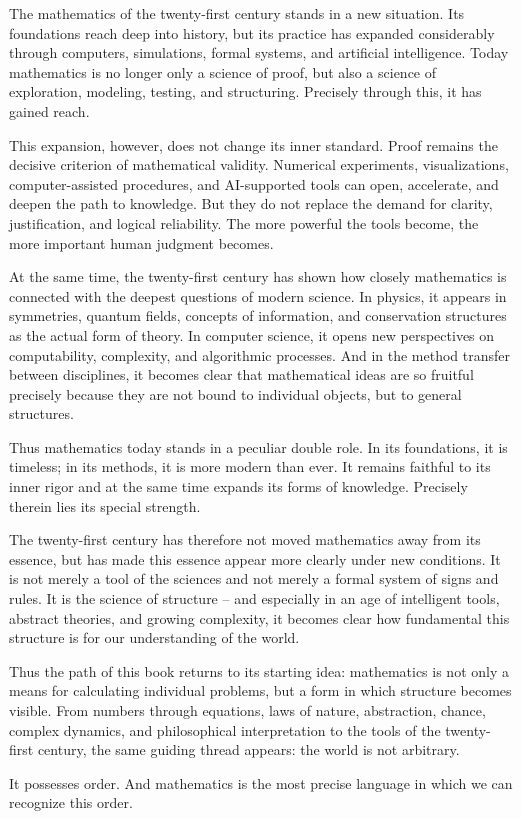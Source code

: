 The mathematics of the twenty-first century stands in a new situation.
Its foundations reach deep into history,
but its practice has expanded considerably through computers,
simulations,
formal systems,
and artificial intelligence.
Today mathematics is no longer only a science of proof,
but also a science of exploration,
modeling,
testing,
and structuring.
Precisely through this, it has gained reach.

This expansion, however, does not change its inner standard.
Proof remains the decisive criterion
of mathematical validity.
Numerical experiments,
visualizations,
computer-assisted procedures,
and AI-supported tools
can open,
accelerate,
and deepen the path to knowledge.
But they do not replace the demand for clarity,
justification,
and logical reliability.
The more powerful the tools become,
the more important human judgment becomes.

At the same time, the twenty-first century has shown
how closely mathematics is connected
with the deepest questions of modern science.
In physics, it appears in symmetries,
quantum fields,
concepts of information,
and conservation structures
as the actual form of theory.
In computer science, it opens new perspectives
on computability,
complexity,
and algorithmic processes.
And in the method transfer between disciplines,
it becomes clear
that mathematical ideas are so fruitful precisely because
they are not bound to individual objects,
but to general structures.

Thus mathematics today stands in a peculiar double role.
In its foundations, it is timeless;
in its methods, it is more modern than ever.
It remains faithful to its inner rigor
and at the same time expands its forms of knowledge.
Precisely therein lies its special strength.

The twenty-first century has therefore not moved mathematics away from its essence,
but has made this essence appear more clearly under new conditions.
It is not merely a tool of the sciences
and not merely a formal system of signs and rules.
It is the science of structure --
and especially in an age of intelligent tools,
abstract theories,
and growing complexity,
it becomes clear
how fundamental this structure is
for our understanding of the world.

\medskip

Thus the path of this book returns to its starting idea:
mathematics is not only a means
for calculating individual problems,
but a form
in which structure becomes visible.
From numbers through equations,
laws of nature,
abstraction,
chance,
complex dynamics,
and philosophical interpretation
to the tools of the twenty-first century,
the same guiding thread appears:
the world is not arbitrary.

It possesses order.
And mathematics is the most precise language
in which we can recognize this order.